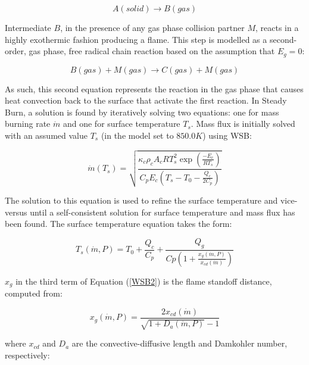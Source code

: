 \begin{equation}
A(solid)\rightarrow B(gas)
\end{equation}

Intermediate $B$, in the presence of any gas phase collision partner $M$, reacts in a highly exothermic fashion producing a flame.  This step is modelled as a second-order, gas phase, free radical chain reaction based on the assumption that $E_g = 0$:

\begin{equation}
B(gas)+M(gas)\rightarrow C(gas)+M(gas)
\end{equation}

As such, this second equation represents the reaction in the gas phase that causes heat convection back to the surface that activate the first reaction.  In Steady Burn, a solution is found by iteratively solving two equations: one for mass burning rate $\dot{m}$ and one for surface temperature $T_s$.  Mass flux is initially solved with an assumed value $T_s$ (in the model set to $850.0 K$) using WSB:

\begin{equation}
\dot{m}\left(T_s\right)=\sqrt{\frac{\displaystyle \kappa_c \rho_c A_c R T_s^2 \exp\left({\frac{\displaystyle -E_c}{\displaystyle R T_s}}\right)}{\displaystyle C_p E_c \left(T_s - T_0 - \frac{Q_c}{2 C_p}\right)}}
\label{WSB1}
\end{equation}

The solution to this equation is used to refine the surface temperature and vice-versus until a self-consistent solution for surface temperature and mass flux has been found.  The surface temperature equation takes the form:

\begin{equation}
T_s(\dot{m},P)=T_0 + \frac{\displaystyle Q_c}{\displaystyle C_p} + \frac{Q_g}{Cp\left(1+\frac{\displaystyle x_g\left(\dot{m},P\right)}{\displaystyle x_{cd}(\dot{m})}\right)}
\label{WSB2}
\end{equation}

$x_g$ in the third term of Equation (\ref{WSB2}) is the flame standoff distance, computed from:

\begin{equation}
x_g\left(\dot{m},P\right)=\frac{2 x_{cd}\left(\dot{m}\right)}{\displaystyle \sqrt{1 + D_a\left(\dot{m},P\right)} - 1}
\label{WSB3}
\end{equation}

where $x_{cd}$ and $D_a$ are the convective-diffusive length and Damkohler number, respectively:

